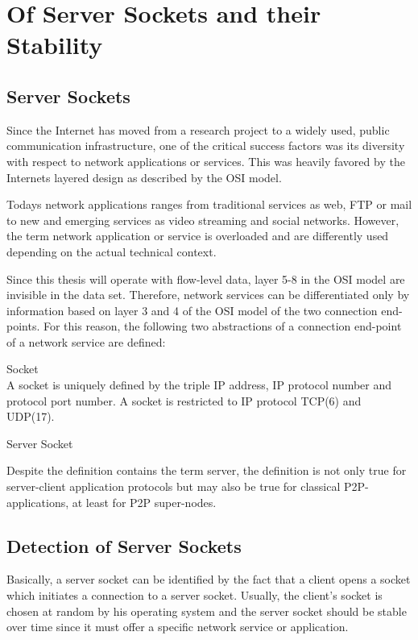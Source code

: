 \chapter{Of Server Sockets and their Stability}

\section{Server Sockets}
Since the Internet has moved from a research project to a widely used, public communication infrastructure, one of the critical success factors was its diversity with respect to network applications or services. This was heavily favored by the Internets layered design as described by the OSI model. 

Todays network applications ranges from traditional services as web, FTP or mail to new and emerging services as video streaming and social networks. However, the term network application or service is overloaded and are differently used depending on the actual technical context.

Since this thesis will operate with flow-level data, layer 5-8 in the OSI model are invisible in the data set. Therefore, network services can be differentiated only by information based on layer 3 and 4 of the OSI model of the two connection end-points. For this reason, the following two abstractions of a connection end-point of a network service are defined:
\begin{defn}{Socket\\}
A socket is uniquely defined by the triple IP address, IP protocol number and protocol port number. A socket is restricted to IP protocol TCP(6) and UDP(17).
\end{defn}

\begin{defn}{Server Socket\\}
\end{defn}

Despite the definition contains the term server, the definition is not only true for server-client application protocols but may also be true for classical P2P-applications, at least for P2P super-nodes. 

\section{Detection of Server Sockets}
Basically, a server socket can be identified by the fact that a client opens a socket which initiates a connection to a server socket. Usually, the client's socket is chosen at random by his operating system and the server socket should be stable over time since it must offer a specific network service or application. 

